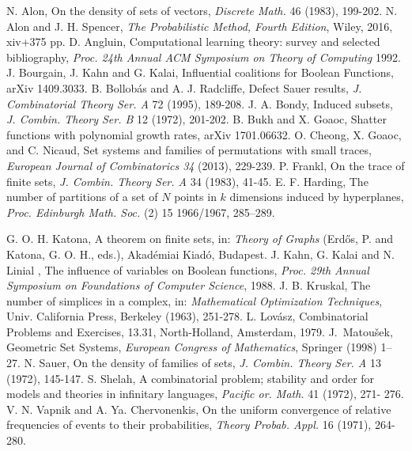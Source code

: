 \documentclass[11pt]{article}
\begin{document}
\begin{thebibliography}{99}
	N. Alon, On the density of sets of vectors, {\em Discrete Math.} 46
	(1983), 199-202.
	N. Alon and J. H. Spencer, {\em The Probabilistic Method, 
		Fourth Edition}, Wiley, 2016, xiv+375 pp.
	D. Angluin, Computational learning theory: survey and selected bibliography, 
	{\it Proc. 24th Annual ACM Symposium on Theory of Computing} 1992.
	J. Bourgain, J. Kahn and G. Kalai,
	Influential coalitions for Boolean Functions,
	arXiv 1409.3033.
	B. Bollob\'as and A. J. Radcliffe,
	Defect Sauer results,
	{\it J. Combinatorial Theory Ser. A} 72 (1995), 189-208.
	J. A. Bondy, Induced subsets, {\it J. Combin. Theory Ser. B} 12
	(1972), 201-202.
	B. Bukh and X. Goaoc,
	Shatter functions with polynomial growth rates,
	arXiv 1701.06632.
	O. Cheong, X. Goaoc, and C. Nicaud, Set systems and families of permutations with small traces, {\it European Journal of Combinatorics 34} (2013), 229-239.
	P. Frankl, On the trace of finite sets, {\it J. Combin. Theory Ser.
		A} 34 (1983), 41-45.
E. F.  Harding, 
The number of partitions of a set of $N$ points in $k$ dimensions 
induced by hyperplanes, 
{\it Proc. Edinburgh Math. Soc.} (2) 15 1966/1967, 285--289. 

	G. O. H. Katona, A theorem on finite sets, in: {\em Theory of Graphs}
	(Erd\H{o}s, P. and Katona, G. O. H., eds.), Akad\'emiai Kiad\'o,
	Budapest.
	J. Kahn, G. Kalai and N. Linial , The influence of variables on
	Boolean functions, {\it Proc. 29th Annual Symposium on Foundations
		of Computer Science}, 1988.
	 J. B. Kruskal, The number of simplices in a complex,
	in: {\em Mathematical Optimization Techniques}, Univ. California
	Press, Berkeley (1963), 251-278.
	 L. Lov\'asz, Combinatorial Problems and Exercises,
	13.31, North-Holland, Amsterdam, 1979.
	J.\ Matou\v sek, Geometric Set Systems, {\it European Congress of
		Mathematics}, Springer (1998) 1–27.
	N. Sauer, On the density of families of sets, 
	{\it J. Combin. Theory Ser. A} 13 (1972), 145-147.
	S. Shelah, A combinatorial problem; stability and order for
	models and theories in infinitary languages, {\it Pacific or. Math.} 41 (1972), 271- 276.
	V. N. Vapnik and A. Ya. Chervonenkis,
	On the uniform convergence of relative frequencies of events to their probabilities, {\it Theory Probab. Appl.} 16 (1971), 264-280.
\end{thebibliography}
\end{document}
